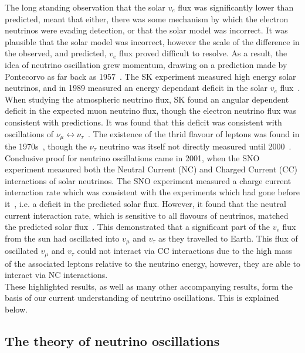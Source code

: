 The long standing observation that the solar $v_{e}$ flux was significantly lower than predicted, meant that either, there was some mechanism by which the electron neutrinos were evading detection, or that the solar model was incorrect. It was plausible that the solar model was incorrect, however the scale of the difference in the observed, and predicted, $v_{e}$ flux proved difficult to resolve. As a result, the idea of neutrino oscillation grew momentum, drawing on a prediction made by Pontecorvo as far back as 1957~\citep{Pontecorvo1957}. The SK experiment measured high energy solar neutrinos, and in 1989 measured an energy dependant deficit in the solar $v_{e}$ flux~\citep{PhysRevLett.63.16}. When studying the atmospheric neutrino flux, SK found an angular dependent deficit in the expected muon neutrino flux, though the electron neutrino flux was consistent with predictions. It was found that this deficit was consistent with oscillations of $\nu_{\mu} \leftrightarrow \nu_{\tau}$~\citep{PhysRevLett.81.1562}. The existence of the thrid flavour of leptons was found in the 1970s~\citep{PhysRevLett.35.1489}, though the $\nu_{\tau}$ neutrino was itself not directly measured until 2000~\citep{Kodama2001218}. \\

Conclusive proof for neutrino oscillations came in 2001, when the SNO experiment measured both the Neutral Current (NC) and Charged Current (CC) interactions of solar neutrinos. The SNO experiment measured a charge current interaction rate which was consistent with the experiments which had gone before it~\citep{Ahmad:2001an}, i.e. a deficit in the predicted solar flux. However, it found that the neutral current interaction rate, which is sensitive to all flavours of neutrinos, matched the predicted solar flux~\citep{PhysRevLett.89.011301}. This demonstrated that a significant part of the $v_{e}$ flux from the sun had oscillated into $v_{\mu}$ and $v_{\tau}$ as they travelled to Earth. This flux of oscillated $v_{\mu}$ and $v_{\tau}$ could not interact via CC interactions due to the high mass of the associated leptons relative to the neutrino energy, however, they are able to interact via NC interactions. \\

These highlighted results, as well as many other accompanying results, form the basis of our current understanding of neutrino oscillations. This is explained below. \\

\subsection{The theory of neutrino oscillations} \label{Neut_Oscil}


